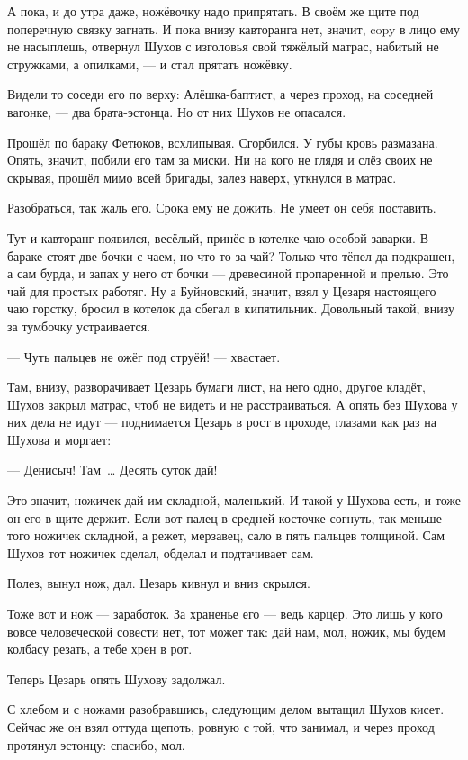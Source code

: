 А пока, и до утра даже, ножёвочку надо припрятать. В своём же щите под поперечную связку 
загнать. И пока внизу кавторанга нет, значит, copy в лицо ему не насыплешь, отвернул Шухов с 
изголовья свой тяжёлый матрас, набитый не стружками, а опилками, --- и стал прятать ножёвку.

Видели то соседи его по верху: Алёшка-баптист, а через проход, на соседней вагонке, --- два 
брата-эстонца. Но от них Шухов не опасался.

Прошёл по бараку Фетюков, всхлипывая. Сгорбился. У губы кровь размазана. Опять, значит, 
побили его там за миски. Ни на кого не глядя и слёз своих не скрывая, прошёл мимо всей бригады, 
залез наверх, уткнулся в матрас.

Разобраться, так жаль его. Срока ему не дожить. Не умеет он себя поставить.

Тут и кавторанг появился, весёлый, принёс в котелке чаю особой заварки. В бараке стоят две 
бочки с чаем, но что то за чай? Только что тёпел да подкрашен, а сам бурда, и запах у него от 
бочки --- древесиной пропаренной и прелью. Это чай для простых работяг. Ну а Буйновский, 
значит, взял у Цезаря настоящего чаю горстку, бросил в котелок да сбегал в кипятильник. 
Довольный такой, внизу за тумбочку устраивается.

--- Чуть пальцев не ожёг под струёй! --- хвастает.

Там, внизу, разворачивает Цезарь бумаги лист, на него одно, другое кладёт, Шухов закрыл 
матрас, чтоб не видеть и не расстраиваться. А опять без Шухова у них дела не идут --- 
поднимается Цезарь в рост в проходе, глазами как раз на Шухова и моргает:

--- Денисыч! Там~\dots{} Десять суток дай!

Это значит, ножичек дай им складной, маленький. И такой у Шухова есть, и тоже он его в щите 
держит. Если вот палец в средней косточке согнуть, так меньше того ножичек складной, а режет, 
мерзавец, сало в пять пальцев толщиной. Сам Шухов тот ножичек сделал, обделал и подтачивает 
сам.

Полез, вынул нож, дал. Цезарь кивнул и вниз скрылся.

Тоже вот и нож --- заработок. За храненье его --- ведь карцер. Это лишь у кого вовсе человеческой 
совести нет, тот может так: дай нам, мол, ножик, мы будем колбасу резать, а тебе хрен в рот.

Теперь Цезарь опять Шухову задолжал.

С хлебом и с ножами разобравшись, следующим делом вытащил Шухов кисет. Сейчас же он взял 
оттуда щепоть, ровную с той, что занимал, и через проход протянул эстонцу: спасибо, мол.

